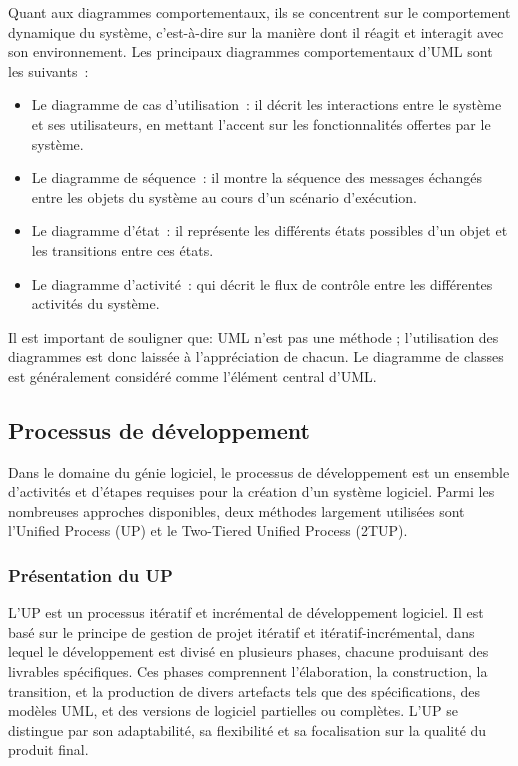 Quant aux diagrammes comportementaux, ils se concentrent sur le comportement
dynamique du système, c’est-à-dire sur la manière dont il réagit et interagit
avec son environnement. Les principaux diagrammes comportementaux d’UML sont
les suivants :

\begin{itemize}

  \item  Le diagramme de cas d’utilisation : il décrit les interactions entre
    le système et ses utilisateurs, en mettant l’accent sur les fonctionnalités
    offertes par le système.

  \item Le diagramme de séquence : il montre la séquence des messages échangés
    entre les objets du système au cours d’un scénario d’exécution.

  \item Le diagramme d’état : il représente les différents états possibles d’un
    objet et les transitions entre ces états.

  \item Le diagramme d’activité : qui décrit le flux de contrôle entre les
    différentes activités du système.

\end{itemize}

Il est important de souligner que: UML n’est pas une méthode ;
l’utilisation des diagrammes est donc laissée à l’appréciation de chacun.
Le diagramme de classes est généralement considéré comme l’élément central d’UML.

\subsection{Processus de développement}
Dans le domaine du génie logiciel, le processus de développement est un ensemble
d’activités et d’étapes requises pour la création d’un système logiciel.
Parmi les nombreuses approches disponibles, deux méthodes largement utilisées
sont l’Unified Process (\ac{UP}) et le Two-Tiered Unified Process (\ac{2TUP}).

\subsubsection{Présentation du UP}
L’UP est un processus itératif et incrémental de développement logiciel. Il est
basé sur le principe de gestion de projet itératif et itératif-incrémental, dans
lequel le développement est divisé en plusieurs phases, chacune produisant des
livrables spécifiques. Ces phases comprennent l’élaboration, la construction,
la transition, et la production de divers artefacts tels que des spécifications,
des modèles UML, et des versions de logiciel partielles ou complètes. L’UP se
distingue par son adaptabilité, sa flexibilité et sa focalisation sur la qualité du produit final.

